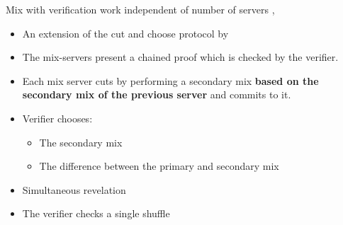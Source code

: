 \documentclass{beamer}
\begin{document}
\begin{frame}{Mix with verification work independent of number of servers \cite{abe98},\cite{adidaPhd}}
\begin{itemize}
\item An extension of the cut and choose protocol by \cite{SK95}
\item The mix-servers present a chained proof which is checked by the verifier.
\item Each mix server cuts by performing a secondary mix \textbf{based on the secondary mix of the previous server} and commits to it.
\item Verifier chooses:
\begin{itemize}
\item The secondary mix 
\item The difference between the primary and secondary mix
\end{itemize}
\item Simultaneous revelation
\item The verifier checks a single shuffle
\end{itemize}
\end{frame}
\end{document}
